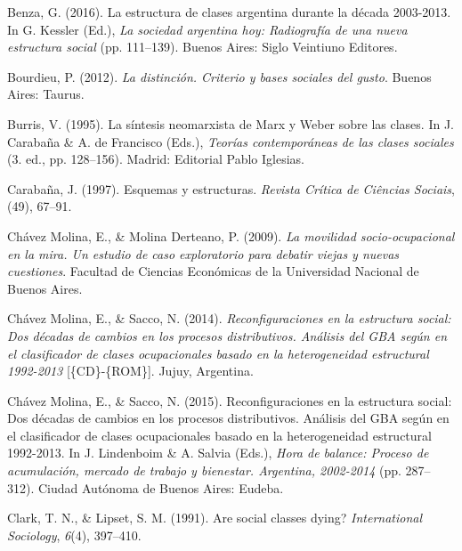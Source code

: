 \documentclass[
]{article}
\newlength{\cslhangindent}
\newlength{\cslentryspacingunit} %
\newenvironment{CSLReferences}[2] %
 {%
  \setlength{\parindent}{0pt}
  \ifodd #1
  \let\oldpar\par
  \def\par{\hangindent=\cslhangindent\oldpar}
  \fi
  \setlength{\parskip}{#2\cslentryspacingunit}
 }%
 {}
\begin{document}
\begin{CSLReferences}{1}{0}
\leavevmode{}%
Benza, G. (2016). La estructura de clases argentina durante la década 2003-2013. In G. Kessler (Ed.), \emph{La sociedad argentina hoy: Radiografía de una nueva estructura social} (pp. 111--139). Buenos Aires: Siglo Veintiuno Editores.

\leavevmode{}%
Bourdieu, P. (2012). \emph{La distinción. {Criterio} y bases sociales del gusto}. Buenos Aires: Taurus.

\leavevmode{}%
Burris, V. (1995). La síntesis neomarxista de {Marx} y {Weber} sobre las clases. In J. Carabaña \& A. de Francisco (Eds.), \emph{Teorías contemporáneas de las clases sociales} (3. ed., pp. 128--156). Madrid: Editorial Pablo Iglesias.

\leavevmode{}%
Carabaña, J. (1997). Esquemas y estructuras. \emph{Revista Crítica de Ciências Sociais}, (49), 67--91.

\leavevmode{}%
Chávez Molina, E., \& Molina Derteano, P. (2009). \emph{La movilidad socio-ocupacional en la mira. {Un} estudio de caso exploratorio para debatir viejas y nuevas cuestiones}. Facultad de Ciencias Económicas de la Universidad Nacional de Buenos Aires.

\leavevmode{}%
Chávez Molina, E., \& Sacco, N. (2014). \emph{Reconfiguraciones en la estructura social: Dos décadas de cambios en los procesos distributivos. {Análisis} del {GBA} según en el clasificador de clases ocupacionales basado en la heterogeneidad estructural 1992-2013} {[}\{CD\}-\{ROM\}{]}. Jujuy, Argentina.

\leavevmode{}%
Chávez Molina, E., \& Sacco, N. (2015). Reconfiguraciones en la estructura social: Dos décadas de cambios en los procesos distributivos. {Análisis} del {GBA} según en el clasificador de clases ocupacionales basado en la heterogeneidad estructural 1992-2013. In J. Lindenboim \& A. Salvia (Eds.), \emph{Hora de balance: Proceso de acumulación, mercado de trabajo y bienestar. {Argentina}, 2002-2014} (pp. 287--312). Ciudad Autónoma de Buenos Aires: Eudeba.

\leavevmode{}%
Clark, T. N., \& Lipset, S. M. (1991). Are social classes dying? \emph{International Sociology}, \emph{6}(4), 397--410.


\end{CSLReferences}
\end{document}
